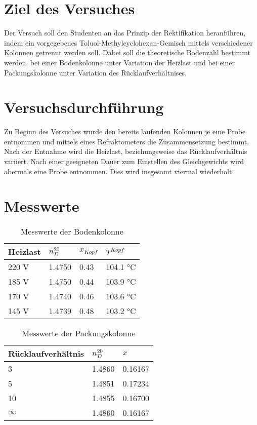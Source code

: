 \documentclass{article}
\begin{document}
%
%

\noindent
\section{Ziel des Versuches}
Der Versuch soll den Studenten an das Prinzip der Rektifikation heranführen, indem ein
vorgegebenes Toluol-Methylcyclohexan-Gemisch mittels verschiedener Kolonnen getrennt
werden soll. Dabei soll die theoretische Bodenzahl bestimmt werden, bei einer
Bodenkolonne unter Variation der Heizlast und bei einer Packungskolonne unter Variation
des Rücklaufverhältnises.
\section{Versuchsdurchführung}
Zu Beginn des Versuches wurde den bereits laufenden Kolonnen je eine Probe entnommen
und mittels eines Refraktometers die Zusammensetzung bestimmt. Nach der Entnahme wird
die Heizlast, beziehungsweise das Rücklaufverhältnis variiert. Nach einer geeigneten Dauer
zum Einstellen des Gleichgewichts wird abermals eine Probe entnommen. Dies wird
insgesamt viermal wiederholt.
\section{Messwerte}
\begin{table}[ht!]
  \centering
 \begin{tabularx}{\textwidth}{XXXX}
Heizlast & $n^{20}_D$ & $x_{Kopf}$ &  $T^{Kopf}$  \\
\hline
\rowcolor{LightCyan}
220 V & 1.4750 & 0.43 &  104.1 \si\celsius    \\
185 V & 1.4750 & 0.44 &  103.9 \si\celsius    \\
170 V & 1.4740 & 0.46 &  103.6 \si\celsius    \\
145 V & 1.4739 & 0.48 &  103.2 \si\celsius    \\
\end{tabularx}
  \caption{Messwerte der Bodenkolonne}

\end{table}

\begin{table}[ht!]
  \centering
 \begin{tabularx}{\textwidth}{XXX}
Rücklaufverhältnis & $n^{20}_D$  & $x$  \\
\hline
\rowcolor{LightCyan}
3 & 1.4860 &  0.16167   \\
5  & 1.4851 &   0.17234   \\
\rowcolor{LightCyan}
10  & 1.4855 &  0.16700   \\
$\infty$  & 1.4860 &  0.16167  \\
\end{tabularx}
  \caption{Messwerte der Packungskolonne}
\end{table}
\end{document}
